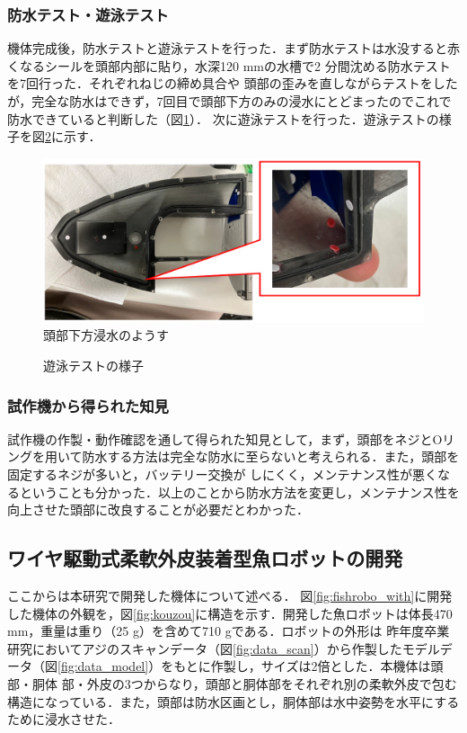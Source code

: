 \subsubsection{防水テスト・遊泳テスト}
機体完成後，防水テストと遊泳テストを行った．まず防水テストは水没すると赤くなるシールを頭部内部に貼り，水深120 mmの水槽で2 分間沈める防水テストを7回行った．それぞれねじの締め具合や
頭部の歪みを直しながらテストをしたが，完全な防水はできず，7回目で頭部下方のみの浸水にとどまったのでこれで防水できていると判断した（図\ref{fig:bousuitest_sisaku}）．
次に遊泳テストを行った．遊泳テストの様子を図\ref{fig:test_sisaku}に示す．

\begin{figure}[t]
    \centering
    \includegraphics[width=0.80\linewidth]{chapters/picture/bousuitest.png}
    \caption{頭部下方浸水のようす}
    \label{fig:bousuitest_sisaku}
\end{figure}
\begin{figure}[t]
    \centering
    \caption{遊泳テストの様子}
    \label{fig:test_sisaku}
\end{figure}

\subsubsection{試作機から得られた知見}
試作機の作製・動作確認を通して得られた知見として，まず，頭部をネジとOリングを用いて防水する方法は完全な防水に至らないと考えられる．また，頭部を固定するネジが多いと，バッテリー交換が
しにくく，メンテナンス性が悪くなるということも分かった．以上のことから防水方法を変更し，メンテナンス性を向上させた頭部に改良することが必要だとわかった．

\newpage

\subsection{ワイヤ駆動式柔軟外皮装着型魚ロボットの開発}
ここからは本研究で開発した機体について述べる．
図\ref{fig:fishrobo_with}に開発した機体の外観を，図\ref{fig:kouzou}に構造を示す．開発した魚ロボットは体長470 mm，重量は重り（25 g）を含めて710 gである．ロボットの外形は
昨年度卒業研究においてアジのスキャンデータ（図\ref{fig:data_scan}）から作製したモデルデータ（図\ref{fig:data_model}）をもとに作製し，サイズは2倍とした．本機体は頭部・胴体
部・外皮の3つからなり，頭部と胴体部をそれぞれ別の柔軟外皮で包む構造になっている．また，頭部は防水区画とし，胴体部は水中姿勢を水平にするために浸水させた．


